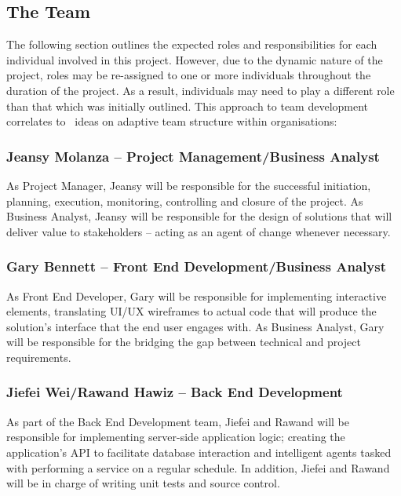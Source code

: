 \subsection{The Team}

The following section outlines the expected roles and responsibilities for each individual involved in this project. However, due to the dynamic nature of the project, roles may be re-assigned to one or more individuals throughout the duration of the project. As a result, individuals may need to play a different role than that which was initially outlined. This approach to team development correlates to~\textcite{book:xteams} ideas on adaptive team structure within organisations:

\subsubsection{Jeansy Molanza -- Project Management/Business Analyst}

As Project Manager, Jeansy will be responsible for the successful initiation, planning, execution, monitoring, controlling and closure of the project. As Business Analyst, Jeansy will be responsible for the design of solutions that will deliver value to stakeholders -- acting as an agent of change whenever necessary.

\subsubsection{Gary Bennett -- Front End Development/Business Analyst}

As Front End Developer, Gary will be responsible for implementing interactive elements, translating UI/UX wireframes to actual code that will produce the solution's interface that the end user engages with. As Business Analyst, Gary will be responsible for the bridging the gap between technical and project requirements.

\subsubsection{Jiefei Wei/Rawand Hawiz -- Back End Development}

As part of the Back End Development team, Jiefei and Rawand will be responsible for implementing server-side application logic; creating the application's API to facilitate database interaction and intelligent agents tasked with performing a service on a regular schedule. In addition, Jiefei and Rawand will be in charge of writing unit tests and source control.